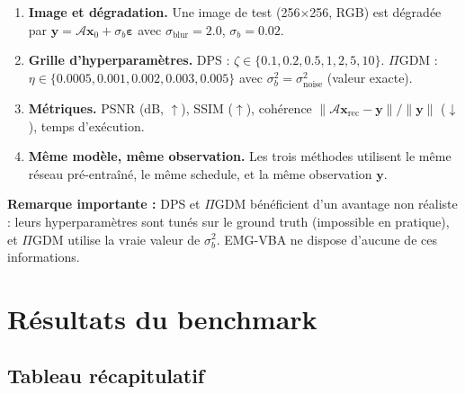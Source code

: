 \documentclass[12pt]{article}
\newcommand{\y}{\boldsymbol{y}}
\newcommand{\x}{\boldsymbol{x}}
\newcommand{\op}{\mathcal{A}}
\begin{document}
\begin{enumerate}
    \item \textbf{Image et dégradation.} Une image de test (256$\times$256, RGB) est dégradée par $\y = \op\x_0 + \sigma_b \boldsymbol{\varepsilon}$ avec $\sigma_{\text{blur}} = 2.0$, $\sigma_b = 0.02$.
    \item \textbf{Grille d'hyperparamètres.} DPS : $\zeta \in \{0.1, 0.2, 0.5, 1, 2, 5, 10\}$. $\Pi$GDM : $\eta \in \{0.0005, 0.001, 0.002, 0.003, 0.005\}$ avec $\sigma_b^2 = \sigma_{\text{noise}}^2$ (valeur exacte).
    \item \textbf{Métriques.} PSNR (dB, $\uparrow$), SSIM ($\uparrow$), cohérence $\|\op\x_{\text{rec}} - \y\| / \|\y\|$ ($\downarrow$), temps d'exécution.
    \item \textbf{Même modèle, même observation.} Les trois méthodes utilisent le même réseau pré-entraîné, le même schedule, et la même observation $\y$.
\end{enumerate}

\textbf{Remarque importante :} DPS et $\Pi$GDM bénéficient d'un avantage non réaliste : leurs hyperparamètres sont tunés sur le ground truth (impossible en pratique), et $\Pi$GDM utilise la vraie valeur de $\sigma_b^2$. EMG-VBA ne dispose d'aucune de ces informations.

\section{Résultats du benchmark}

\subsection{Tableau récapitulatif}
\end{document}

